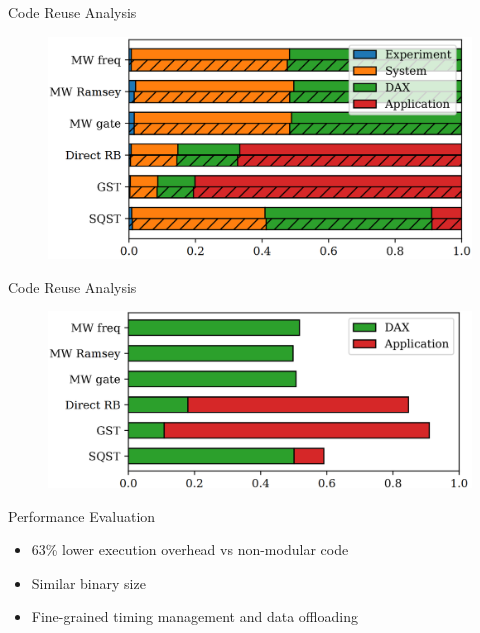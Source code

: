 \documentclass[18 pt]{beamer}
\begin{document}
  
  \begin{frame}{Code Reuse Analysis}
    \begin{figure}
      \includegraphics[width=.8\textwidth]{fig6.png}
    \end{figure}
  \end{frame}
  \begin{frame}{Code Reuse Analysis}
    \begin{figure}
      \includegraphics[width=.8\textwidth]{fig7.png}
    \end{figure}
  \end{frame}
\begin{frame}{Performance Evaluation}
\begin{itemize}
\item 63\% lower execution overhead vs non-modular code
\item Similar binary size
\item Fine-grained timing management and data offloading
\end{itemize}
\end{frame}
\end{document}
